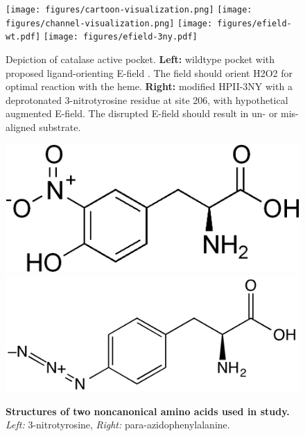 \documentclass[9pt,twocolumn,twoside]{pnas-new}
\begin{document}
\begin{figure}
  \texttt{[image: figures/cartoon-visualization.png]}
  \texttt{[image: figures/channel-visualization.png]}
  \texttt{[image: figures/efield-wt.pdf]}
  \texttt{[image: figures/efield-3ny.pdf]}%
  \caption{Depiction of catalase active pocket. \textbf{Left:} wildtype pocket with proposed ligand-orienting E-field \cite{electricpotential}. The field should orient H2O2 for optimal reaction with the heme. \textbf{Right:} modified HPII-3NY with a deprotonated 3-nitrotyrosine residue at site 206, with hypothetical augmented E-field. The disrupted E-field should result in un- or mis-aligned substrate.}
  \label{fig:hypothesis}
\end{figure}

\begin{figure}
  \includegraphics[width=0.4\linewidth]{figures/3ny.png}
  \hspace{0.1\linewidth}
  \includegraphics[width=0.5\linewidth]{figures/pazf.png}
  \caption{\textbf{Structures of two noncanonical amino acids used in study.} \textit{Left:} 3-nitrotyrosine, \textit{Right:} para-azidophenylalanine.}
  \label{fig:noncanonicals}
\end{figure}
\end{document}
